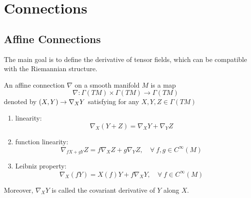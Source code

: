 \chapter{Connections}

\section{Affine Connections}
The main goal is to define the derivative of tensor fields, which can be compatible with the Riemannian structure.
\begin{defn}
	An affine connection $\nabla$ on a smooth manifold $M$ is a map
	\begin{equation*}
		\nabla \colon \Gamma(TM) \times \Gamma(TM) \longrightarrow \Gamma(TM)
	\end{equation*}
	denoted by $(X,Y) \rightarrow \nabla_XY$ satisfying for any $X,Y,Z \in \Gamma(TM)$
	\begin{enumerate}[label=\Roman{*}.]
		\item linearity:
		\begin{equation*}
			\nabla_X(Y+Z) = \nabla_XY+\nabla_YZ
		\end{equation*}
		\item function linearity:
		\begin{equation*}
			\nabla_{fX+gY}Z = f\nabla_XZ + g\nabla_YZ,\quad \forall~f,g \in C^\infty(M)
		\end{equation*}
		\item Leibniz property:
		\begin{equation*}
			\nabla_X(fY) = X(f)Y+f\nabla_XY,\quad \forall~f \in C^\infty(M)
		\end{equation*}
	\end{enumerate}
	Moreover, $\nabla_XY$ is called the covariant derivative of $Y$ along $X$.
\end{defn}
